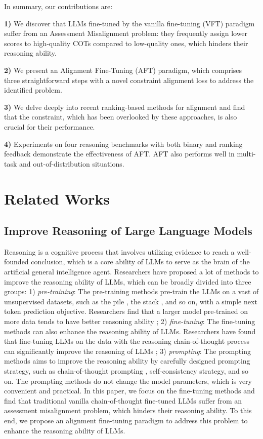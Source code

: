 In summary, our contributions are:

 \textbf{1)} We discover that LLMs fine-tuned by the vanilla fine-tuning (VFT) paradigm suffer from an Assessment Misalignment problem: they frequently assign lower scores to high-quality COTs compared to low-quality ones, which hinders their reasoning ability.

\textbf{2)} We present an Alignment Fine-Tuning (AFT) paradigm, which comprises three straightforward steps with a novel constraint alignment loss to address the identified problem.

\textbf{3)} We delve deeply into recent ranking-based methods for alignment and find that the constraint, which has been overlooked by these approaches, is also crucial for their performance.

\textbf{4)} Experiments on four reasoning benchmarks with both binary and ranking feedback demonstrate the effectiveness of AFT. AFT also performs well in multi-task and out-of-distribution situations.

\section{Related Works}

\subsection{Improve Reasoning of Large Language Models} Reasoning is a cognitive process that involves utilizing evidence to reach a well-founded conclusion, which is a core ability of LLMs to serve as the brain of the artificial general intelligence agent. Researchers have proposed a lot of methods to improve the reasoning ability of LLMs, which can be broadly divided into three groups: 1) \textit{pre-training}: The pre-training methods pre-train the LLMs on a vast of unsupervised datasets, such as the pile \citep{pile}, the stack \citep{stack}, and so on,  with a simple next token prediction objective. Researchers find that a larger model pre-trained on more data tends to have better reasoning ability  \citep{gpt4,palm,llama}; 2) \textit{fine-tuning}: The fine-tuning methods can also enhance the reasoning ability of LLMs. Researchers have found that fine-tuning LLMs on the data with the reasoning chain-of-thought process can significantly improve the reasoning of LLMs \citep{mukherjee2023orca,chung2022scaling,li2023m}; 3) \textit{prompting}: The prompting methods aims to improve the reasoning ability by carefully designed prompting strategy, such as chain-of-thought prompting \citep{cot}, self-consistency \citep{self-consistency} strategy, and so on. The prompting methods do not change the model parameters, which is very convenient and practical. In this paper, we focus on the fine-tuning methods and find that traditional vanilla chain-of-thought fine-tuned LLMs suffer from an assessment misalignment problem, which hinders their reasoning ability. To this end, we propose an alignment fine-tuning paradigm to address this problem to enhance the reasoning ability of LLMs.

